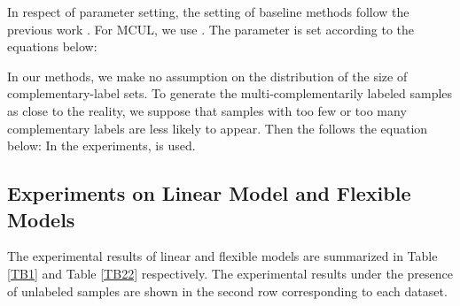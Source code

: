 \documentclass[]{article} \usepackage{geometry}
\begin{document}
In respect of parameter setting, the setting of baseline methods follow the previous work \cite{DBLP:conf/icml/IshidaNMS19}. For MCUL, we use . The parameter  is set according to the equations below:


In our methods, we make no assumption on the distribution of the size of complementary-label sets. To generate the multi-complementarily labeled samples as close to the reality, we suppose that samples with too few or too many complementary labels are less likely to appear. Then the  follows the equation below:
 In the experiments,  is used.
\subsection{Experiments on Linear Model and Flexible Models}
The experimental results of linear and flexible models are summarized in Table \ref{TB1} and Table \ref{TB22} respectively. The experimental results under the presence of unlabeled samples are shown in the second row corresponding to each dataset.
\end{document}
